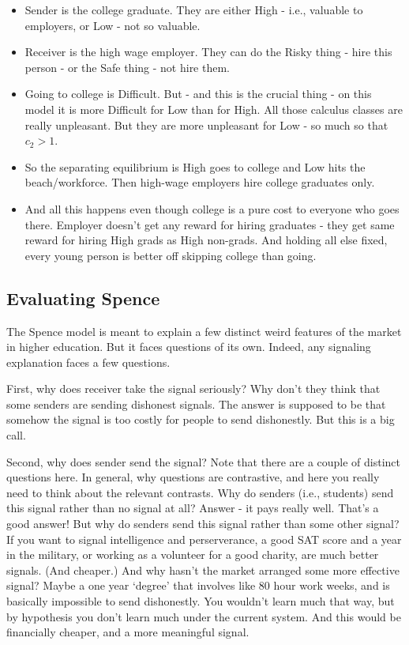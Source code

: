 \documentclass[
  11pt,
]{article}
\providecommand{\tightlist}{%
  \setlength{\itemsep}{0pt}\setlength{\parskip}{0pt}}
\begin{document}
\begin{itemize}
\tightlist
\item
  Sender is the college graduate. They are either High - i.e., valuable
  to employers, or Low - not so valuable.
\item
  Receiver is the high wage employer. They can do the Risky thing - hire
  this person - or the Safe thing - not hire them.
\item
  Going to college is Difficult. But - and this is the crucial thing -
  on this model it is more Difficult for Low than for High. All those
  calculus classes are really unpleasant. But they are more unpleasant
  for Low - so much so that \(c_2 > 1\).
\item
  So the separating equilibrium is High goes to college and Low hits the
  beach/workforce. Then high-wage employers hire college graduates only.
\item
  And all this happens even though college is a pure cost to everyone
  who goes there. Employer doesn't get any reward for hiring graduates -
  they get same reward for hiring High grads as High non-grads. And
  holding all else fixed, every young person is better off skipping
  college than going.
\end{itemize}

\hypertarget{evaluating-spence}{%
\subsection{Evaluating Spence}\label{evaluating-spence}}

The Spence model is meant to explain a few distinct weird features of
the market in higher education. But it faces questions of its own.
Indeed, any signaling explanation faces a few questions.

First, why does receiver take the signal seriously? Why don't they think
that some senders are sending dishonest signals. The answer is supposed
to be that somehow the signal is too costly for people to send
dishonestly. But this is a big call.

Second, why does sender send the signal? Note that there are a couple of
distinct questions here. In general, why questions are contrastive, and
here you really need to think about the relevant contrasts. Why do
senders (i.e., students) send this signal rather than no signal at all?
Answer - it pays really well. That's a good answer! But why do senders
send this signal rather than some other signal? If you want to signal
intelligence and perserverance, a good SAT score and a year in the
military, or working as a volunteer for a good charity, are much better
signals. (And cheaper.) And why hasn't the market arranged some more
effective signal? Maybe a one year `degree' that involves like 80 hour
work weeks, and is basically impossible to send dishonestly. You
wouldn't learn much that way, but by hypothesis you don't learn much
under the current system. And this would be financially cheaper, and a
more meaningful signal.
\end{document}
